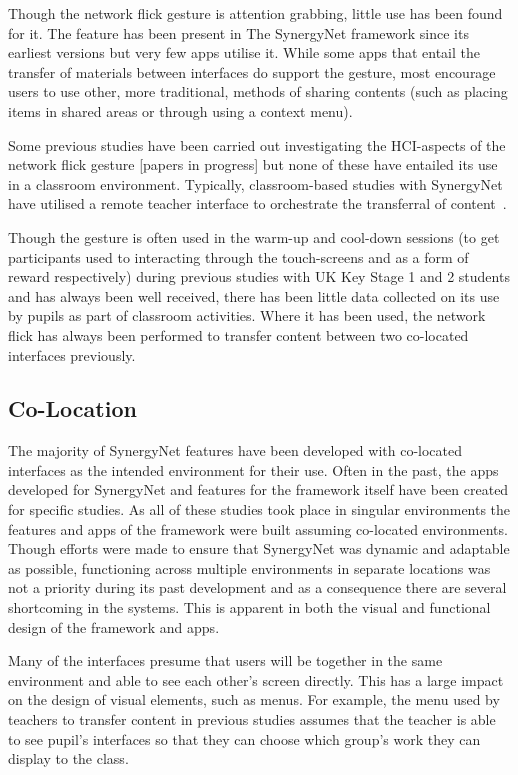 \documentclass[a4paper,11pt]{article}
\begin{document}
Though the network flick gesture is attention grabbing, little use has been found for it.
The feature has been present in The SynergyNet framework since its earliest versions but very few apps utilise it.
While some apps that entail the transfer of materials between interfaces do support the gesture, most encourage users to use other, more traditional, methods of sharing contents (such as placing items in shared areas or through using a context menu).

Some previous studies have been carried out investigating the HCI-aspects of the network flick gesture [papers in progress] but none of these have entailed its use in a classroom environment.
Typically, classroom-based studies with SynergyNet have utilised a remote teacher interface to orchestrate the transferral of content~\cite{joycegibbons:2016}.

Though the gesture is often used in the warm-up and cool-down sessions (to get participants used to interacting through the touch-screens and as a form of reward respectively) during previous studies with UK Key Stage 1 and 2 students and has always been well received, there has been little data collected on its use by pupils as part of classroom activities.
Where it has been used, the network flick has always been performed to transfer content between two co-located interfaces previously.

\subsection{Co-Location}

The majority of SynergyNet features have been developed with co-located interfaces as the intended environment for their use.
Often in the past, the apps developed for SynergyNet and features for the framework itself have been created for specific studies.
As all of these studies took place in singular environments the features and apps of the framework were built assuming co-located environments.
Though efforts were made to ensure that SynergyNet was dynamic and adaptable as possible, functioning across multiple environments in separate locations was not a priority during its past development and as a consequence there are several shortcoming in the systems.
This is apparent in both the visual and functional design of the framework and apps.

Many of the interfaces presume that users will be together in the same environment and able to see each other's screen directly.
This has a large impact on the design of visual elements, such as menus.
For example, the menu used by teachers to transfer content in previous studies assumes that the teacher is able to see pupil's interfaces so that they can choose which group's work they can display to the class.
\end{document}
